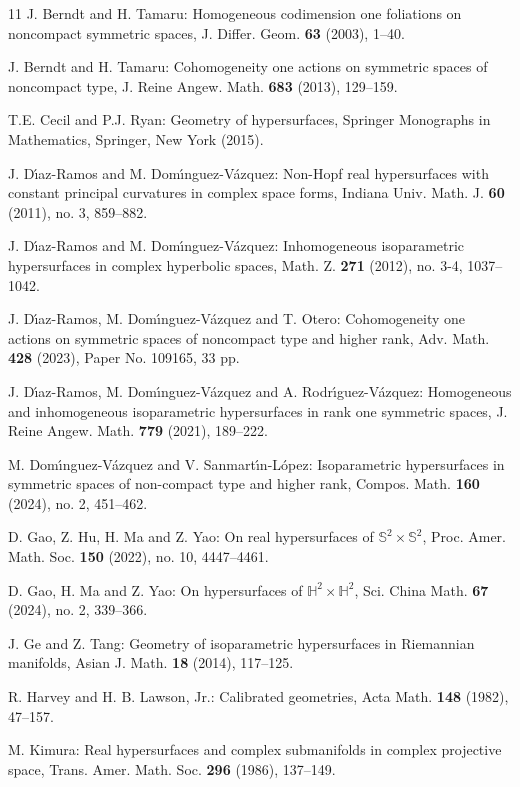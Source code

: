 \documentclass[reqno]{amsart}%
\theoremstyle{definition}
\numberwithin{equation}{section}
\begin{document}
\begin{thebibliography}{11}
J. Berndt and H. Tamaru: Homogeneous codimension one foliations on noncompact symmetric
spaces, J. Differ. Geom. {\bf 63} (2003), 1--40.

J. Berndt and H. Tamaru: Cohomogeneity one actions on symmetric spaces of noncompact type,
J. Reine Angew. Math. {\bf 683} (2013), 129--159.

T.E. Cecil and P.J. Ryan: Geometry of hypersurfaces, Springer Monographs
in Mathematics, Springer, New York (2015).

J. D\'{\i}az-Ramos and M. Dom\'{\i}nguez-V\'{a}zquez: 
Non-Hopf real hypersurfaces with constant principal curvatures in complex space forms, Indiana Univ. Math. J. {\bf60} (2011), no. 3, 859--882.

J. D\'{\i}az-Ramos and M. Dom\'{\i}nguez-V\'{a}zquez:  
Inhomogeneous isoparametric hypersurfaces in complex hyperbolic spaces,  Math. Z. {\bf271} (2012), no. 3-4, 1037--1042.

J. D\'{\i}az-Ramos, M. Dom\'{\i}nguez-V\'{a}zquez and T. Otero:
Cohomogeneity one actions on symmetric spaces of noncompact type and higher rank,
Adv. Math. {\bf428} (2023), Paper No. 109165, 33 pp.

J. D\'{\i}az-Ramos, M. Dom\'{\i}nguez-V\'{a}zquez and A. Rodr\'{\i}guez-V\'{a}zquez: 
Homogeneous and inhomogeneous isoparametric hypersurfaces in rank one symmetric spaces, 
J. Reine Angew. Math. {\bf779} (2021), 189--222.

M. Dom\'{\i}nguez-V\'{a}zquez and V. Sanmart\'{\i}n-L\'{o}pez: 
Isoparametric hypersurfaces in symmetric spaces of non-compact type and higher rank, 
Compos. Math. {\bf160} (2024), no. 2, 451--462.


D. Gao, Z. Hu, H. Ma and Z. Yao: On real hypersurfaces of $\mathbb{S}^2\times \mathbb{S}^2$, 
Proc. Amer. Math. Soc. {\bf150} (2022), no. 10, 4447--4461.

D. Gao, H. Ma and Z. Yao: On hypersurfaces of $\mathbb{H}^2\times \mathbb{H}^2$,
Sci. China Math. {\bf67} (2024), no. 2, 339--366.

J. Ge and Z. Tang:
Geometry of isoparametric hypersurfaces in Riemannian manifolds,
Asian J. Math. {\bf18} (2014), 117--125.

R. Harvey and H. B. Lawson, Jr.:
Calibrated geometries, Acta Math. {\bf148} (1982), 47--157.

M. Kimura:
Real hypersurfaces and complex submanifolds in complex projective
space, Trans. Amer. Math. Soc. {\bf 296} (1986), 137--149.


\end{thebibliography}
\end{document}
